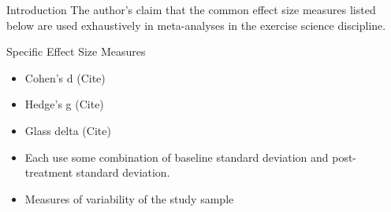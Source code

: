 \documentclass[
  ignorenonframetext,
  aspectratio=169,
]{beamer}
\begin{document}
\begin{frame}{Introduction}
\protect\hypertarget{introduction}{}
The author's claim that the common effect size measures listed below are
used exhaustively in meta-analyses in the exercise science discipline.

\begin{block}{Specific Effect Size Measures}
\protect\hypertarget{specific-effect-size-measures}{}
\begin{itemize}
\item
  Cohen's d (Cite)
\item
  Hedge's g (Cite)
\item
  Glass delta (Cite)
\item
  Each use some combination of baseline standard deviation and
  post-treatment standard deviation.
\item
  Measures of variability of the study sample
\end{itemize}
\end{block}
\end{frame}
\end{document}
